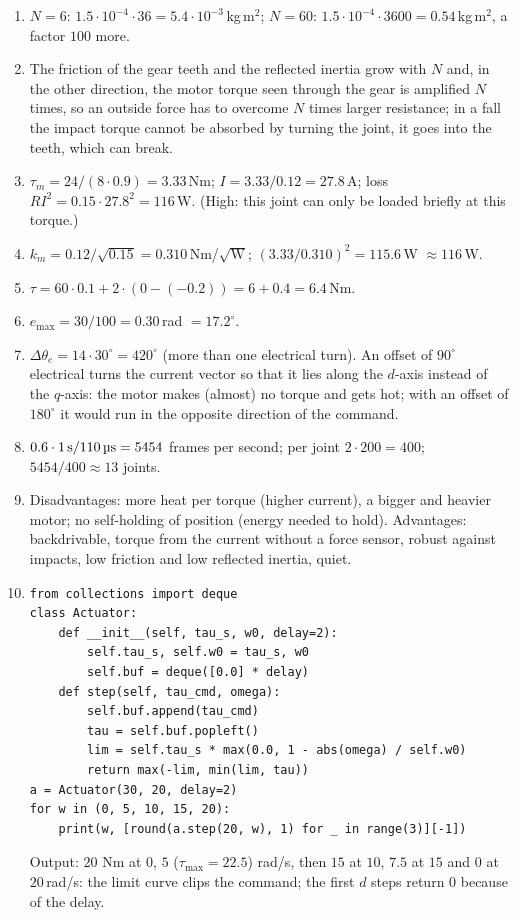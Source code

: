 \begin{enumerate}[label=\textbf{\ansnum.\arabic*}]
  \item $N=6$: $1.5\cdot10^{-4}\cdot36=5.4\cdot10^{-3}$\,kg\,m$^2$; $N=60$: $1.5\cdot10^{-4}\cdot3600=0.54$\,kg\,m$^2$, a factor $100$ more.
  \item The friction of the gear teeth and the reflected inertia grow with $N$ and, in the other direction, the motor torque seen through the gear is amplified $N$ times, so an outside force has to overcome $N$ times larger resistance; in a fall the impact torque cannot be absorbed by turning the joint, it goes into the teeth, which can break.
  \item $\tau_m=24/(8\cdot0.9)=3.33$\,Nm; $I=3.33/0.12=27.8$\,A; loss $RI^2=0.15\cdot27.8^2=116$\,W. (High: this joint can only be loaded briefly at this torque.)
  \item $k_m=0.12/\sqrt{0.15}=0.310$\,Nm/$\sqrt{\text{W}}$; $(3.33/0.310)^2=115.6$\,W $\approx116$\,W. \checkmark
  \item $\tau=60\cdot0.1+2\cdot(0-(-0.2))=6+0.4=6.4$\,Nm.
  \item $e_\text{max}=30/100=0.30$\,rad $=17.2^\circ$.
  \item $\Delta\theta_e=14\cdot30^\circ=420^\circ$ (more than one electrical turn). An offset of $90^\circ$ electrical turns the current vector so that it lies along the $d$-axis instead of the $q$-axis: the motor makes (almost) no torque and gets hot; with an offset of $180^\circ$ it would run in the opposite direction of the command.
  \item $0.6\cdot1\,\text{s}/110\,\text{\textmu s}=5454$ frames per second; per joint $2\cdot200=400$; $5454/400\approx13$ joints.
  \item Disadvantages: more heat per torque (higher current), a bigger and heavier motor; no self-holding of position (energy needed to hold). Advantages: backdrivable, torque from the current without a force sensor, robust against impacts, low friction and low reflected inertia, quiet.
  \item[\textbf{\ansnum.10}]
\begin{verbatim}
from collections import deque
class Actuator:
    def __init__(self, tau_s, w0, delay=2):
        self.tau_s, self.w0 = tau_s, w0
        self.buf = deque([0.0] * delay)
    def step(self, tau_cmd, omega):
        self.buf.append(tau_cmd)
        tau = self.buf.popleft()
        lim = self.tau_s * max(0.0, 1 - abs(omega) / self.w0)
        return max(-lim, min(lim, tau))
a = Actuator(30, 20, delay=2)
for w in (0, 5, 10, 15, 20):
    print(w, [round(a.step(20, w), 1) for _ in range(3)][-1])
\end{verbatim}
  Output: $20$ Nm at $0$, $5$ ($\tau_\text{max}=22.5$) rad/s, then $15$ at $10$, $7.5$ at $15$ and $0$ at $20$\,rad/s: the limit curve clips the command; the first $d$ steps return $0$ because of the delay.
\end{enumerate}
